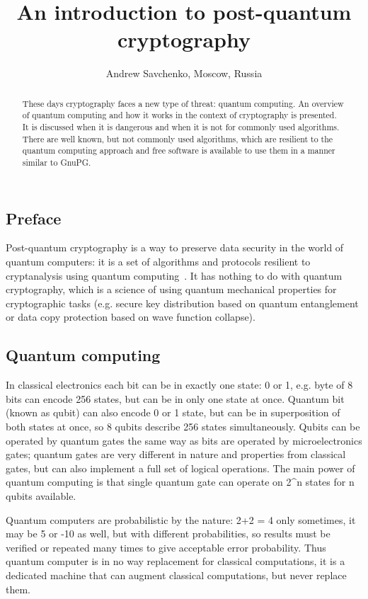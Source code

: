\documentclass[10pt, a5paper]{article}
\begin{document}
\title{An introduction to post-quantum cryptography}
\author{Andrew Savchenko, Moscow, Russia}
\maketitle
\begin{abstract}
These days cryptography faces a new type of threat: quantum
computing. An overview of quantum computing and how it works in the context of cryptography is presented. It is discussed when it is dangerous and when it is not for commonly used algorithms. There are well known, but not commonly used algorithms, which are resilient to the quantum computing approach and free \linebreak software is available to use them in a manner similar to GnuPG.
\end{abstract}
\subsection*{Preface}

Post-quantum cryptography is a way to preserve data security in the world of quantum computers: it is a set of algorithms and protocols resilient to cryptanalysis using quantum computing~\cite{Savchenko1}. It has nothing to do with quantum cryptography, which is a science of using quantum mechanical properties for cryptographic tasks (e.g. secure key \linebreak distribution based on quantum entanglement or data copy protection based on wave function collapse).

\subsection*{Quantum computing}

In classical electronics each bit can be in exactly one state: 0 or 1, e.g. byte of 8 bits can encode 256 states, but can be in only one state at once. Quantum bit (known as qubit) can also encode 0 or 1 state, but can be in superposition of both states at once, so 8 qubits describe 256 states simultaneously. Qubits can be operated by quantum gates the same way as bits are operated by microelectronics gates; quantum gates are very different in nature and properties from classical gates, but can also implement a full set of logical operations. The main power of quantum computing is that single quantum gate can operate on 2\^{}n states for n qubits available.

Quantum computers are probabilistic by the nature: 2+2 = 4 only sometimes, it may be 5 or -10 as well, but with different probabilities, so results must be verified or repeated many times to give acceptable error probability. Thus quantum computer is in no way replacement for classical computations, it is a dedicated machine that can augment classical computations, but never replace them.
\end{document}
